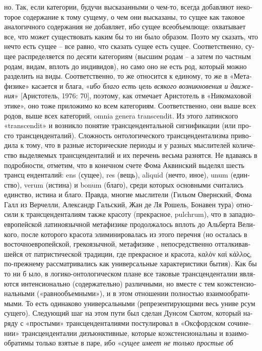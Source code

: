 \begin{russian}
{    но. 
    Так, если категории, будучи высказанными о чем-то, всегда добавляют некоторое содержание к тому сущему, о чем они высказаны, то сущее как таковое аналогичного содержания не добавляет, ибо сущее всеобъемлюще: охватывает все, что может существовать каким бы то ни было образом. Поэто
    му сказать, что нечто есть сущее – все равно, что сказать сущее есть сущее. Соответственно, сущее распределяется по десяти категориям (высшим родам – а затем по частным родам, видам, вплоть до индивидов), но само оно не есть род, который можно разделить на виды. 
    Соответственно, то же относится к единому, то же в «Метафизике» касается и блага, «\textit{ибо благо есть цель всякого возникновения и движения}» [Аристотель, 1976: 70], поэтому, как отмечает Аристотель в «Никомаховой этике», оно тоже приложимо ко всем категориям. Соответственно, 
    они выше всех родов, выше всех категорий, omnia genera transcendit. Из этого латинского «transcendit» и возникло понятие трансцендентальной сигнификации (или просто трансценденталий). 
    Сложность онтологического трансцендентализма приводила к тому, что в разные исторические периоды и у разных мыслителей количество выделяемых трансценденталий и их перечень весьма разнятся. Не вдаваясь в подробности, отметим, что в конечном счете Фома Аквинский выделял шесть трансц
    енденталий: ens (сущее), res (вещь), aliquid (нечто, иное), unum (единство), verum (истина) и bonum (благо), среди которых основными считались единство, истина и благо. Правда, многие мыслители (Гильом Овернский, Фома Галл из Верчелли, Александр Гальский, Жан де Ля Рошель, Бонавен
    тура) относили к трансценденталиям также красоту (прекрасное, pulchrum), что в западноевропейской латиноязычной метафизике продолжалось вплоть до Альберта Великого, после которого красота элиминировалась из этого перечня (но осталась в восточноевропейской, грекоязычной, метафизике
    , непосредственно отталкивавшейся от патристической традиции, где прекрасное и красота, καλὸν καὶ κάλλος, по-прежнему рассматривались как универсальные характеристики бытия). Как бы то ни б
    ыло, в логико-онтологическом плане все таковые трансценденталии являются интенсионально (содержательно) различными, но вместе с тем коэкстенсиональными («равнообъемными»), и в этом отношении полностью взаимообратимыми. То есть одинаково универсальными (репрезентирующими весь униве
    рсум сущего). 
    Следующий шаг на этом пути был сделан Дунсом Скотом, который наряду с «простыми» трансценденталиями постулировал в «Оксфордском сочинении» трансценденталии дизъюнктивные, которые коэкстенсиональны и взаимообратимы только взятые в паре, ибо «\textit{сущее имеет не только простые об
}}
\end{russian}
